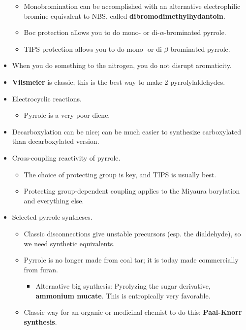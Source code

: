 \documentclass[../notes.tex]{subfiles}
\begin{document}
\begin{itemize}
\begin{itemize}
        \item Monobromination can be accomplished with an alternative electrophilic bromine equivalent to NBS, called \textbf{dibromodimethylhydantoin}.
        \item Boc protection allows you to do mono- or di-$\alpha$-brominated pyrrole.
        \item TIPS protection allows you to do mono- or di-$\beta$-brominated pyrrole.
    \end{itemize}
    \item When you do something to the nitrogen, you do not disrupt aromaticity.
    \item \textbf{Vilsmeier} is classic; this is the best way to make 2-pyrrolylaldehydes.
    \item Electrocyclic reactions.
    \begin{itemize}
        \item Pyrrole is a very poor diene.
    \end{itemize}
    \item Decarboxylation can be nice; can be much easier to synthesize carboxylated than decarboxylated version.
    \item Cross-coupling reactivity of pyrrole.
    \begin{itemize}
        \item The choice of protecting group is key, and TIPS is usually best.
        \item Protecting group-dependent coupling applies to the Miyaura borylation and everything else.
    \end{itemize}
    \item Selected pyrrole syntheses.
    \begin{itemize}
        \item Classic disconnections give unstable precursors (esp. the dialdehyde), so we need synthetic equivalents.
        \item Pyrrole is no longer made from coal tar; it is today made commercially from furan.
        \begin{itemize}
            \item Alternative big synthesis: Pyrolyzing the sugar derivative, \textbf{ammonium mucate}. This is entropically very favorable.
        \end{itemize}
        \item Classic way for an organic or medicinal chemist to do this: \textbf{Paal-Knorr synthesis}.
        \begin{itemize}

\end{itemize}
\end{itemize}
\end{itemize}
\end{document}
